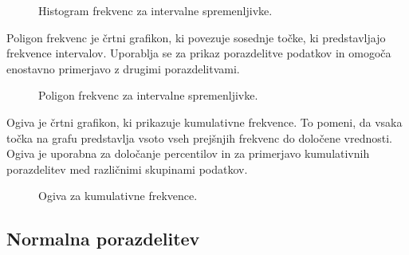 \begin{figure}
    \centering
    \caption{Histogram frekvenc za intervalne spremenljivke.}
\end{figure}

Poligon frekvenc je črtni grafikon, ki povezuje sosednje točke, ki predstavljajo frekvence intervalov. Uporablja se za prikaz porazdelitve podatkov in omogoča enostavno primerjavo z drugimi porazdelitvami.

\begin{figure}
    \centering
    \caption{Poligon frekvenc za intervalne spremenljivke.}
\end{figure}

Ogiva je črtni grafikon, ki prikazuje kumulativne frekvence. To pomeni, da vsaka točka na grafu predstavlja vsoto vseh prejšnjih frekvenc do določene vrednosti. Ogiva je uporabna za določanje percentilov in za primerjavo kumulativnih porazdelitev med različnimi skupinami podatkov.

\begin{figure}
    \centering
    \caption{Ogiva za kumulativne frekvence.}
\end{figure}

\subsection*{Normalna porazdelitev}

